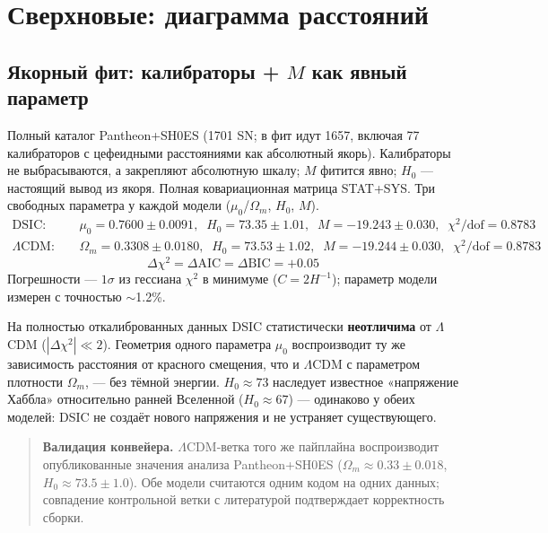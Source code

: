 \documentclass{article}
\begin{document}
\section{Сверхновые: диаграмма расстояний}

\subsection{Якорный фит: калибраторы + $M$ как явный параметр}

Полный каталог Pantheon+SH0ES (1701 SN; в фит идут 1657, включая 77 калибраторов с цефеидными расстояниями как абсолютный якорь). Калибраторы не выбрасываются, а закрепляют абсолютную шкалу; $M$ фитится явно; $H_0$ --- настоящий вывод из якоря. Полная ковариационная матрица STAT+SYS. Три свободных параметра у каждой модели ($\mu_0$/$\Omega_m$, $H_0$, $M$).
\begin{align*}
\text{DSIC}: &\quad \mu_0 = 0.7600 \pm 0.0091,\;\; H_0 = 73.35 \pm 1.01,\;\; M = -19.243 \pm 0.030,\;\; \chi^2/\text{dof} = 0.8783 \\
\Lambda\text{CDM}: &\quad \Omega_m = 0.3308 \pm 0.0180,\;\; H_0 = 73.53 \pm 1.02,\;\; M = -19.244 \pm 0.030,\;\; \chi^2/\text{dof} = 0.8783
\end{align*}
\begin{equation*}
\Delta\chi^2 = \Delta\text{AIC} = \Delta\text{BIC} = +0.05
\end{equation*}
Погрешности --- $1\sigma$ из гессиана $\chi^2$ в минимуме ($C = 2H^{-1}$); параметр модели измерен с точностью $\sim$1.2\%.

На полностью откалиброванных данных DSIC статистически \textbf{неотличима} от $\Lambda$CDM ($|\Delta\chi^2| \ll 2$). Геометрия одного параметра $\mu_0$ воспроизводит ту же зависимость расстояния от красного смещения, что и $\Lambda$CDM с параметром плотности $\Omega_m$, --- без тёмной энергии. $H_0 \approx 73$ наследует известное «напряжение Хаббла» относительно ранней Вселенной ($H_0 \approx 67$) --- одинаково у обеих моделей: DSIC не создаёт нового напряжения и не устраняет существующего.

\begin{quote}
\textbf{Валидация конвейера.} $\Lambda$CDM-ветка того же пайплайна воспроизводит опубликованные значения анализа Pantheon+SH0ES ($\Omega_m \approx 0.33 \pm 0.018$, $H_0 \approx 73.5 \pm 1.0$). Обе модели считаются одним кодом на одних данных; совпадение контрольной ветки с литературой подтверждает корректность сборки.
\end{quote}
\end{document}
